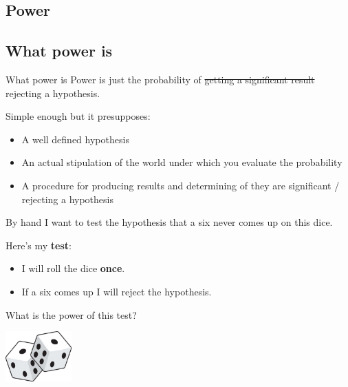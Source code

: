\documentclass[
  11pt,
  ignorenonframetext,
]{beamer}
\providecommand{\tightlist}{%
  \setlength{\itemsep}{0pt}\setlength{\parskip}{0pt}}\usepackage{longtable,booktabs,array}
\begin{document}
\hypertarget{power}{%
\subsection{Power}\label{power}}

\hypertarget{what-power-is}{%
\subsection{What power is}\label{what-power-is}}

\begin{frame}{What power is}
Power is just the probability of \st{getting a significant result}
rejecting a hypothesis.

Simple enough but it presupposes:

\begin{itemize}
\tightlist
\item
  A well defined hypothesis
\item
  An actual stipulation of the world under which you evaluate the
  probability
\item
  A procedure for producing results and determining of they are
  significant / rejecting a hypothesis
\end{itemize}
\end{frame}

\begin{frame}{By hand}
\protect\hypertarget{by-hand}{}
I want to test the hypothesis that a six never comes up on this dice.

Here's my \textbf{test}:

\begin{itemize}
\tightlist
\item
  I will roll the dice \textbf{once}.
\item
  If a six comes up I will reject the hypothesis.
\end{itemize}

What is the power of this test?

\includegraphics[width=1in,height=\textheight]{assets/dice.jpeg}
\end{frame}
\end{document}
